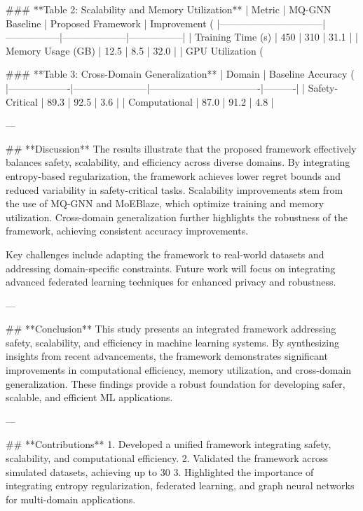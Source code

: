 ### **Table 2: Scalability and Memory Utilization**
| Metric                         | MQ-GNN Baseline | Proposed Framework | Improvement (%
|--------------------------------|-----------------|--------------------|-----------------|
| Training Time (s)              | 450             | 310                | 31.1            |
| Memory Usage (GB)              | 12.5            | 8.5                | 32.0            |
| GPU Utilization (%

### **Table 3: Cross-Domain Generalization**
| Domain           | Baseline Accuracy (%
|-------------------|-----------------------|----------------------------------|----------|
| Safety-Critical   | 89.3                 | 92.5                            | 3.6      |
| Computational     | 87.0                 | 91.2                            | 4.8      |

---

## **Discussion**
The results illustrate that the proposed framework effectively balances safety, scalability, and efficiency across diverse domains. By integrating entropy-based regularization, the framework achieves lower regret bounds and reduced variability in safety-critical tasks. Scalability improvements stem from the use of MQ-GNN and MoEBlaze, which optimize training and memory utilization. Cross-domain generalization further highlights the robustness of the framework, achieving consistent accuracy improvements.

Key challenges include adapting the framework to real-world datasets and addressing domain-specific constraints. Future work will focus on integrating advanced federated learning techniques for enhanced privacy and robustness.

---

## **Conclusion**
This study presents an integrated framework addressing safety, scalability, and efficiency in machine learning systems. By synthesizing insights from recent advancements, the framework demonstrates significant improvements in computational efficiency, memory utilization, and cross-domain generalization. These findings provide a robust foundation for developing safer, scalable, and efficient ML applications.

---

## **Contributions**
1. Developed a unified framework integrating safety, scalability, and computational efficiency.
2. Validated the framework across simulated datasets, achieving up to 30%
3. Highlighted the importance of integrating entropy regularization, federated learning, and graph neural networks for multi-domain applications.

